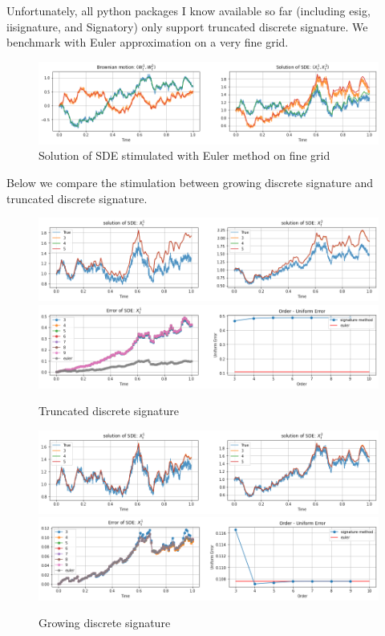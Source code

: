 \documentclass[12pt]{report}
\theoremstyle{definition}
\theoremstyle{remark}
\begin{document}
Unfortunately, all python packages I know available so far (including esig, iisignature, and Signatory) only support truncated discrete signature. We benchmark with Euler approximation on a very fine grid.
\begin{figure}[H]
    \centering
    \includegraphics[width=\textwidth]{figs/sde1.png}
    \caption{Solution of SDE stimulated with Euler method on fine grid}
\end{figure}
Below we compare the stimulation between growing discrete signature and truncated discrete signature.
\begin{figure}[H]
    \centering
    \includegraphics[width=\textwidth]{figs/sde2.png}
    \includegraphics[width=\textwidth]{figs/sde3.png}
    \caption{Truncated discrete signature}
\end{figure}
\begin{figure}[H]
    \centering
    \includegraphics[width=\textwidth]{figs/sde4.png}
    \includegraphics[width=\textwidth]{figs/sde5.png}
    \caption{Growing discrete signature}
\end{figure}
\end{document}
